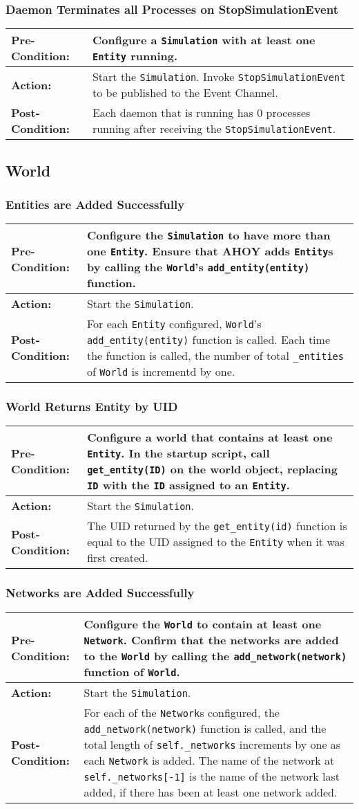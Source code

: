 \documentclass[titlepage]{article}
\newcommand{\testcase}[3]{
    \begin{center}
    \begin{tabular}{| l | p{0.7\textwidth}|}
        \hline
        \rowcolor[gray]{0.8}\textbf{Pre-Condition:} & #1 \\ \hline
        \textbf{Action:} & #2 \\ \hline
        \rowcolor[gray]{0.8}\textbf{Post-Condition:} & #3 \\ \hline
    \end{tabular}
    \end{center}
}
\begin{document}
\subsubsection{Daemon Terminates all Processes on StopSimulationEvent}
\testcase{Configure a \texttt{Simulation} with at least one \texttt{Entity} running.}{Start the \texttt{Simulation}. Invoke \texttt{StopSimulationEvent} to be published to the Event Channel.}{Each daemon that is running has 0 processes running after receiving the \texttt{StopSimulationEvent}.}

\subsection{World}
\subsubsection{Entities are Added Successfully}
\testcase{Configure the \texttt{Simulation} to have more than one \texttt{Entity}.  Ensure that AHOY adds \texttt{Entity}s by calling the \texttt{World}'s \texttt{add\_entity(entity)} function.}{Start the \texttt{Simulation}.}{For each \texttt{Entity} configured, \texttt{World}'s \texttt{add\_entity(entity)} function is called.  Each time the function is called, the number of total \texttt{\_entities} of \texttt{World} is incrementd by one.}

\subsubsection{World Returns Entity by UID}
\testcase{Configure a world that contains at least one \texttt{Entity}. In the startup script, call \texttt{get\_entity(ID)} on the world object, replacing \texttt{ID} with the \texttt{ID} assigned to an \texttt{Entity}.}{Start the \texttt{Simulation}.}{The UID returned by the \texttt{get\_entity(id)} function is equal to the UID assigned to the \texttt{Entity} when it was first created.}

\subsubsection{Networks are Added Successfully}
\testcase{Configure the \texttt{World} to contain at least one \texttt{Network}.  Confirm that the networks are added to the \texttt{World} by calling the \texttt{add\_network(network)} function of \texttt{World}.}{Start the \texttt{Simulation}.}{For each of the \texttt{Network}s configured, the \texttt{add\_network(network)} function is called, and the total length of \texttt{self.\_networks} increments by one as each \texttt{Network} is added.  The name of the network at \texttt{self.\_networks[-1]} is the name of the network last added, if there has been at least one network added.}
\end{document}
